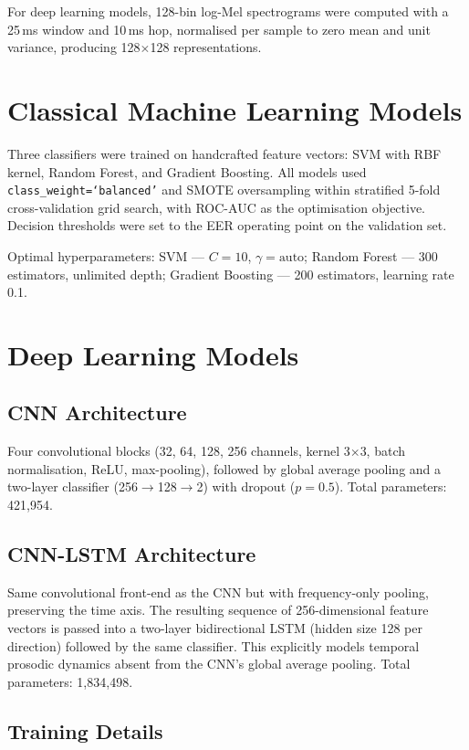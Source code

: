 \documentclass[12pt, a4paper, oneside]{report}
\begin{document}
For deep learning models, 128-bin log-Mel spectrograms were computed with a 25\,ms window and 10\,ms hop, normalised per sample to zero mean and unit variance, producing 128$\times$128 representations.

\section{Classical Machine Learning Models}

Three classifiers were trained on handcrafted feature vectors: SVM with RBF kernel, Random Forest, and Gradient Boosting. All models used \texttt{class\_weight=`balanced'} and SMOTE oversampling within stratified 5-fold cross-validation grid search, with ROC-AUC as the optimisation objective. Decision thresholds were set to the EER operating point on the validation set.

Optimal hyperparameters: SVM --- $C=10$, $\gamma=\text{auto}$; Random Forest --- 300 estimators, unlimited depth; Gradient Boosting --- 200 estimators, learning rate 0.1.

\section{Deep Learning Models}

\subsection{CNN Architecture}

Four convolutional blocks (32, 64, 128, 256 channels, kernel 3$\times$3, batch normalisation, ReLU, max-pooling), followed by global average pooling and a two-layer classifier (256$\to$128$\to$2) with dropout ($p=0.5$). Total parameters: 421,954.

\subsection{CNN-LSTM Architecture}

Same convolutional front-end as the CNN but with frequency-only pooling, preserving the time axis. The resulting sequence of 256-dimensional feature vectors is passed into a two-layer bidirectional LSTM (hidden size 128 per direction) followed by the same classifier. This explicitly models temporal prosodic dynamics absent from the CNN's global average pooling. Total parameters: 1,834,498.

\subsection{Training Details}
\end{document}

